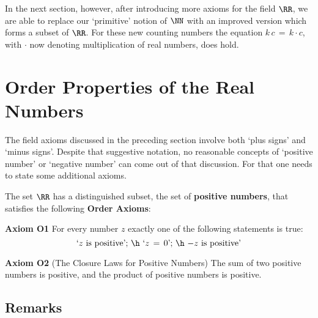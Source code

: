         In the next section, however, after introducing more axioms for the field ${\RR}$,
    we are able to replace our `primitive' notion of ${\NN}$ with an improved version which forms a subset of ${\RR}$.
    For these new counting numbers the equation $k\,c \,=\, k{\cdot}c$, with ${\cdot}$ now denoting multiplication of real numbers, does hold.


\VV



            \section{\bf Order Properties of the Real Numbers}
            \label{SectB20}


\V

        The field axioms discussed in the preceding section involve both `plus signs' and `minus signs'.
    Despite that suggestive notation, no reasonable concepts of `positive number' or `negative number' can come out of that discussion.
    For that one needs to state some additional axioms.

\V
\V

        The set ${\RR}$ has a distinguished subset, the set of {\bf positive numbers}, that satisfies the following {\bf Order Axioms}:

\V

        {\bf Axiom O1} For every number $z$ exactly one of the following statements is true:
        \begin{displaymath}
        \mbox{`$z$ is positive'; \h `$z \,=\, 0$'; \h $-z$ is positive'}
        \end{displaymath}


\V

        {\bf Axiom O2} (The Closure Laws for Positive Numbers) The sum of two positive numbers is positive, and the product of positive numbers is positive.


\V
\V

            \subsection{\small{\bf Remarks}}
            \label{RemrkB20.200}


